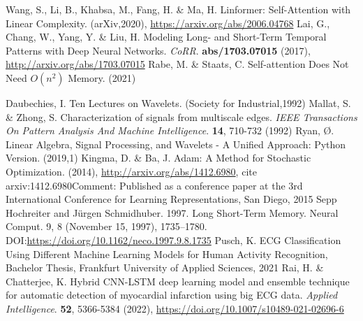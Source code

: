 \documentclass{ieeeaccess}
\begin{document}
\begin{thebibliography}{1}
Wang, S., Li, B., Khabsa, M., Fang, H. \& Ma, H. Linformer: Self-Attention with Linear Complexity. (arXiv,2020), \url{https://arxiv.org/abs/2006.04768}
Lai, G., Chang, W., Yang, Y. \& Liu, H. Modeling Long- and Short-Term Temporal Patterns with Deep Neural Networks. {\em CoRR}. \textbf{abs/1703.07015} (2017), \url{http://arxiv.org/abs/1703.07015}
Rabe, M. \& Staats, C. Self-attention Does Not Need $O(n^2)$ Memory.  (2021)


Daubechies, I. Ten Lectures on Wavelets. (Society for Industrial,1992)
Mallat, S. \& Zhong, S. Characterization of signals from multiscale edges. {\em IEEE Transactions On Pattern Analysis And Machine Intelligence}. \textbf{14}, 710-732 (1992)
Ryan, Ø. Linear Algebra, Signal Processing, and Wavelets - A Unified Approach: Python Version.  (2019,1)
Kingma, D. \& Ba, J. Adam: A Method for Stochastic Optimization.  (2014), \url{http://arxiv.org/abs/1412.6980}, cite arxiv:1412.6980Comment: Published as a conference paper at the 3rd International Conference for Learning Representations, San Diego, 2015
Sepp Hochreiter and Jürgen Schmidhuber. 1997. Long Short-Term Memory. Neural Comput. 9, 8 (November 15, 1997), 1735–1780. DOI:\url{https://doi.org/10.1162/neco.1997.9.8.1735}
Pusch, K. ECG Classification Using Different Machine Learning Models for Human Activity Recognition, Bachelor Thesis, Frankfurt University of Applied Sciences, 2021
Rai, H. \& Chatterjee, K. Hybrid CNN-LSTM deep learning model and ensemble technique for automatic detection of myocardial infarction using big ECG data. {\em Applied Intelligence}. \textbf{52}, 5366-5384 (2022), \url{https://doi.org/10.1007/s10489-021-02696-6}


\end{thebibliography}
\end{document}
